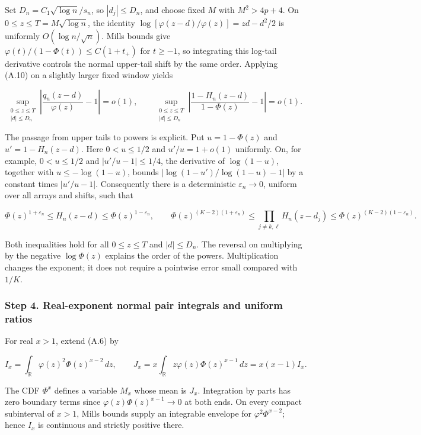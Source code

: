 \documentclass{article}
\begin{document}
Set \(D_n=C_1\sqrt{\log n}/s_n\), so \(|d_j|\le D_n\), and choose fixed
\(M\) with \(M^2>4p+4\). On \(0\le z\le T=M\sqrt{\log n}\), the identity
\(\log[\varphi(z-d)/\varphi(z)]=zd-d^2/2\) is uniformly
\(O(\log n/\sqrt n)\). Mills bounds give
\(\varphi(t)/(1-\Phi(t))\le C(1+t_+)\) for \(t\ge-1\), so integrating
this log-tail derivative controls the normal upper-tail shift by the
same order. Applying (A.10) on a slightly larger fixed window yields

\[
\sup_{\substack{0\le z\le T\\ |d|\le D_n}}
\left|\frac{q_n(z-d)}{\varphi(z)}-1\right|=o(1),\qquad
\sup_{\substack{0\le z\le T\\ |d|\le D_n}}
\left|\frac{1-H_n(z-d)}{1-\Phi(z)}-1\right|=o(1).
\]

The passage from upper tails to powers is explicit. Put \(u=1-\Phi(z)\)
and \(u'=1-H_n(z-d)\). Here \(0<u\le1/2\) and \(u'/u=1+o(1)\) uniformly.
On, for example, \(0<u\le1/2\) and \(|u'/u-1|\le1/4\), the derivative of
\(\log(1-u)\), together with \(u\le-\log(1-u)\), bounds
\(|\log(1-u')/\log(1-u)-1|\) by a constant times \(|u'/u-1|\).
Consequently there is a deterministic \(\varepsilon_n\to0\), uniform
over all arrays and shifts, such that

\[
\Phi(z)^{1+\varepsilon_n}\le H_n(z-d)\le\Phi(z)^{1-\varepsilon_n},\qquad
\Phi(z)^{(K-2)(1+\varepsilon_n)}
\le\prod_{j\ne k,\ell}H_n(z-d_j)
\le\Phi(z)^{(K-2)(1-\varepsilon_n)}.
\]

Both inequalities hold for all \(0\le z\le T\) and \(|d|\le D_n\). The
reversal on multiplying by the negative \(\log\Phi(z)\) explains the
order of the powers. Multiplication changes the exponent; it does not
require a pointwise error small compared with \(1/K\).

\subsubsection*{Step 4. Real-exponent normal pair integrals and uniform
ratios}\label{step-4.-real-exponent-normal-pair-integrals-and-uniform-ratios}

For real \(x>1\), extend (A.6) by

\[
I_x=\int_{\mathbb R}\varphi(z)^2\Phi(z)^{x-2}\,dz,\qquad
J_x=x\int_{\mathbb R}z\varphi(z)\Phi(z)^{x-1}\,dz=x(x-1)I_x.
\]

The CDF \(\Phi^x\) defines a variable \(M_x\) whose mean is \(J_x\).
Integration by parts has zero boundary terms since
\(\varphi(z)\Phi(z)^{x-1}\to0\) at both ends. On every compact
subinterval of \(x>1\), Mills bounds supply an integrable envelope for
\(\varphi^2\Phi^{x-2}\); hence \(I_x\) is continuous and strictly
positive there.
\end{document}
